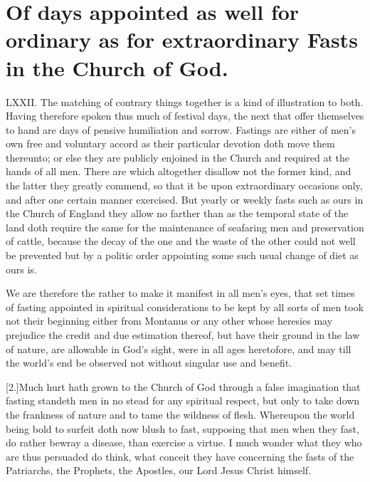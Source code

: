 \section*{Of days appointed as well for ordinary as for extraordinary Fasts in the Church of God.}
LXXII. The matching of contrary things together is a kind of illustration to both. Having therefore spoken thus much of festival days, the next that offer themselves to hand are days of pensive humiliation and sorrow. Fastings are either of men’s own free and voluntary accord as their particular devotion doth move them thereunto; or else they are publicly enjoined in the Church and required at the hands of all men. There are which altogether disallow not the  former kind, and the latter they greatly commend, so that it be upon extraordinary occasions only,
 and after one certain manner exercised. But yearly or weekly fasts such as ours in the Church of England they allow no farther than as the temporal state of the land doth require the same for the maintenance of seafaring men and preservation of cattle, because the decay of the one and the waste of the other could not well be prevented but by a politic order appointing some such usual change of diet as ours is.

We are therefore the rather to make it manifest in all men’s eyes, that set times of fasting appointed in spiritual considerations to be kept by all sorts of men took not their beginning either from Montanus or any other whose heresies may prejudice the credit and due estimation thereof, but have their ground in the law of nature, are allowable in God’s sight, were in all ages heretofore, and may till the world’s end be observed not without singular use and benefit.

[2.]Much hurt hath grown to the Church of God through a false imagination that fasting standeth men in no stead for any spiritual respect, but only to take down the frankness of nature and to tame the wildness of flesh. Whereupon the world being bold to surfeit doth now blush to fast, supposing that men when they fast, do rather bewray a disease, than exercise a virtue. I much wonder what they who are thus persuaded do think, what conceit they have concerning the fasts of the Patriarchs, the Prophets, the Apostles, our Lord Jesus Christ himself.

